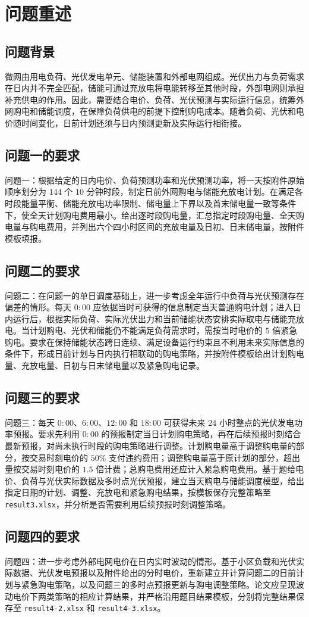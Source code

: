 \section{问题重述}

\subsection{问题背景}
微网由用电负荷、光伏发电单元、储能装置和外部电网组成。光伏出力与负荷需求在日内并不完全匹配，储能可通过充放电将电能转移至其他时段，外部电网则承担补充供电的作用。因此，需要结合电价、负荷、光伏预测与实际运行信息，统筹外网购电和储能调度，在保障负荷供电的前提下控制购电成本。随着负荷、光伏和电价随时间变化，日前计划还须与日内预测更新及实际运行相衔接。

\subsection{问题一的要求}
问题一：根据给定的日内电价、负荷预测功率和光伏预测功率，将一天按附件原始顺序划分为 $144$ 个 $10$ 分钟时段，制定日前外网购电与储能充放电计划。在满足各时段能量平衡、储能充放电功率限制、储电量上下界以及首末储电量一致等条件下，使全天计划购电费用最小。给出逐时段购电量，汇总指定时段购电量、全天购电量与购电费用，并列出六个四小时区间的充放电量及日初、日末储电量，按附件模板填报。

\subsection{问题二的要求}
问题二：在问题一的单日调度基础上，进一步考虑全年运行中负荷与光伏预测存在偏差的情形。每天 $0{:}00$ 应依据当时可获得的信息制定当天普通购电计划；进入日内运行后，根据实际负荷、实际光伏出力和当前储能状态安排实际取电与储能充放电。当计划购电、光伏和储能仍不能满足负荷需求时，需按当时电价的 $5$ 倍紧急购电。要求在保持储能状态跨日连续、满足设备运行约束且不利用未来实际信息的条件下，形成日前计划与日内执行相联动的购电策略，并按附件模板给出计划购电量、充放电量、日初与日末储电量以及紧急购电记录。

\subsection{问题三的要求}
问题三：每天 $0{:}00$、$6{:}00$、$12{:}00$ 和 $18{:}00$ 可获得未来 $24$ 小时整点的光伏发电功率预报。要求先利用 $0{:}00$ 的预报制定当日计划购电策略，再在后续预报时刻结合最新预报，对尚未执行时段的购电策略进行调整。计划购电量高于调整购电量的部分，按交易时刻电价的 $50\%$ 支付违约费用；调整购电量高于原计划的部分，超出量按交易时刻电价的 $1.5$ 倍计费；总购电费用还应计入紧急购电费用。基于题给电价、负荷与光伏实际数据及多时点光伏预报，建立当天购电与储能调度模型，给出指定日期的计划、调整、充放电和紧急购电结果，按模板保存完整策略至 \texttt{result3.xlsx}，并分析是否需要利用后续预报时刻调整策略。

\subsection{问题四的要求}
问题四：进一步考虑外部电网电价在日内实时波动的情形。基于小区负载和光伏实际数据、光伏发电预报以及附件给出的分时电价，重新建立并计算问题二的日前计划与紧急购电策略，以及问题三的多时点预报更新与购电调整策略。论文应呈现波动电价下两类策略的相应计算结果，并严格沿用题目结果模板，分别将完整结果保存至 \texttt{result4-2.xlsx} 和 \texttt{result4-3.xlsx}。
